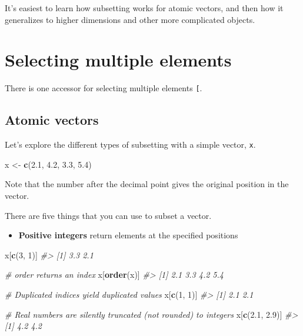 \documentclass[]{book}
\newenvironment{Shaded}{\begin{snugshade}}{\end{snugshade}}
\newcommand{\KeywordTok}[1]{\textcolor[rgb]{0.13,0.29,0.53}{\textbf{#1}}}
\newcommand{\DecValTok}[1]{\textcolor[rgb]{0.00,0.00,0.81}{#1}}
\newcommand{\FloatTok}[1]{\textcolor[rgb]{0.00,0.00,0.81}{#1}}
\newcommand{\StringTok}[1]{\textcolor[rgb]{0.31,0.60,0.02}{#1}}
\newcommand{\CommentTok}[1]{\textcolor[rgb]{0.56,0.35,0.01}{\textit{#1}}}
\newcommand{\NormalTok}[1]{#1}
\providecommand{\tightlist}{%
  \setlength{\itemsep}{0pt}\setlength{\parskip}{0pt}}
\theoremstyle{definition}
\theoremstyle{definition}
\theoremstyle{definition}
\theoremstyle{remark}
\begin{document}
It's easiest to learn how subsetting works for atomic vectors, and then
how it generalizes to higher dimensions and other more complicated
objects.

\section{Selecting multiple elements}\label{selecting-multiple-elements}

There is one accessor for selecting multiple elements \texttt{{[}}.

\subsection{Atomic vectors}\label{atomic-vectors-1}

Let's explore the different types of subsetting with a simple vector,
\texttt{x}.

\begin{Shaded}
\begin{Highlighting}[]
\NormalTok{x <-}\StringTok{ }\KeywordTok{c}\NormalTok{(}\FloatTok{2.1}\NormalTok{, }\FloatTok{4.2}\NormalTok{, }\FloatTok{3.3}\NormalTok{, }\FloatTok{5.4}\NormalTok{)}
\end{Highlighting}
\end{Shaded}

Note that the number after the decimal point gives the original position
in the vector.

There are five things that you can use to subset a vector.

\begin{itemize}
\tightlist
\item
  \textbf{Positive integers} return elements at the specified positions
\end{itemize}

\begin{Shaded}
\begin{Highlighting}[]
\NormalTok{x[}\KeywordTok{c}\NormalTok{(}\DecValTok{3}\NormalTok{, }\DecValTok{1}\NormalTok{)]}
\CommentTok{#> [1] 3.3 2.1}

\CommentTok{# order returns an index}
\NormalTok{x[}\KeywordTok{order}\NormalTok{(x)]}
\CommentTok{#> [1] 2.1 3.3 4.2 5.4}

\CommentTok{# Duplicated indices yield duplicated values}
\NormalTok{x[}\KeywordTok{c}\NormalTok{(}\DecValTok{1}\NormalTok{, }\DecValTok{1}\NormalTok{)]}
\CommentTok{#> [1] 2.1 2.1}

\CommentTok{# Real numbers are silently truncated (not rounded) to integers}
\NormalTok{x[}\KeywordTok{c}\NormalTok{(}\FloatTok{2.1}\NormalTok{, }\FloatTok{2.9}\NormalTok{)]}
\CommentTok{#> [1] 4.2 4.2}
\end{Highlighting}
\end{Shaded}
\end{document}
